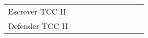 \begin{table}[!htb]
{\begin{tabular}{p{4cm}|l|lllll|lll}
    \rowcolor[rgb]{0.914,0.914,0.914} Escrever TCC II                                                                             &                                      &                                      &                                      &                                      &                                      &                                      &                                      & {\cellcolor[rgb]{0.753,0.753,0.753}} & {\cellcolor[rgb]{0.753,0.753,0.753}} \\
    Defender TCC II                                                                                                              &                                      &                                      &                                      &                                      &                                      &                                      &                                      &                                      & {\cellcolor[rgb]{0.753,0.753,0.753}} \\
    \toprule
  \end{tabular}
}
\end{table}